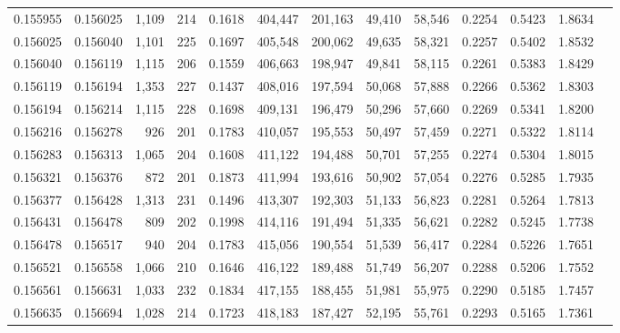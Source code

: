 \begin{tabular}{rrrrrrrrrrrrr}
0.155955 & 0.156025 & 1,109 & 214 &                                     0.1618 & 404,447 & 201,163 &  49,410 &  58,546 & 0.2254 & 0.5423 & 1.8634 \\
0.156025 & 0.156040 & 1,101 & 225 &                                     0.1697 & 405,548 & 200,062 &  49,635 &  58,321 & 0.2257 & 0.5402 & 1.8532 \\
0.156040 & 0.156119 & 1,115 & 206 &                                     0.1559 & 406,663 & 198,947 &  49,841 &  58,115 & 0.2261 & 0.5383 & 1.8429 \\
0.156119 & 0.156194 & 1,353 & 227 &                                     0.1437 & 408,016 & 197,594 &  50,068 &  57,888 & 0.2266 & 0.5362 & 1.8303 \\
0.156194 & 0.156214 & 1,115 & 228 &                                     0.1698 & 409,131 & 196,479 &  50,296 &  57,660 & 0.2269 & 0.5341 & 1.8200 \\
0.156216 & 0.156278 &   926 & 201 &                                     0.1783 & 410,057 & 195,553 &  50,497 &  57,459 & 0.2271 & 0.5322 & 1.8114 \\
0.156283 & 0.156313 & 1,065 & 204 &                                     0.1608 & 411,122 & 194,488 &  50,701 &  57,255 & 0.2274 & 0.5304 & 1.8015 \\
0.156321 & 0.156376 &   872 & 201 &                                     0.1873 & 411,994 & 193,616 &  50,902 &  57,054 & 0.2276 & 0.5285 & 1.7935 \\
0.156377 & 0.156428 & 1,313 & 231 &                                     0.1496 & 413,307 & 192,303 &  51,133 &  56,823 & 0.2281 & 0.5264 & 1.7813 \\
0.156431 & 0.156478 &   809 & 202 &                                     0.1998 & 414,116 & 191,494 &  51,335 &  56,621 & 0.2282 & 0.5245 & 1.7738 \\
0.156478 & 0.156517 &   940 & 204 &                                     0.1783 & 415,056 & 190,554 &  51,539 &  56,417 & 0.2284 & 0.5226 & 1.7651 \\
0.156521 & 0.156558 & 1,066 & 210 &                                     0.1646 & 416,122 & 189,488 &  51,749 &  56,207 & 0.2288 & 0.5206 & 1.7552 \\
0.156561 & 0.156631 & 1,033 & 232 &                                     0.1834 & 417,155 & 188,455 &  51,981 &  55,975 & 0.2290 & 0.5185 & 1.7457 \\
0.156635 & 0.156694 & 1,028 & 214 &                                     0.1723 & 418,183 & 187,427 &  52,195 &  55,761 & 0.2293 & 0.5165 & 1.7361 \\

\end{tabular}
